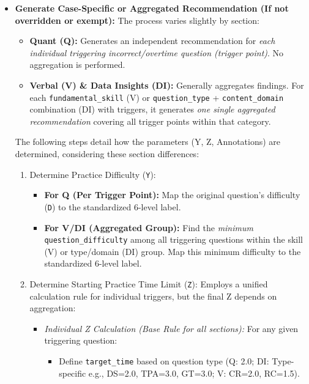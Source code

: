 \documentclass{article}
\begin{document}
\begin{enumerate}
\begin{itemize}
        \item \textbf{Generate Case-Specific or Aggregated Recommendation (If not overridden or exempt):} The process varies slightly by section:
            \begin{itemize}
                \item \textbf{Quant (Q):} Generates an independent recommendation for \textit{each individual triggering incorrect/overtime question (trigger point)}. No aggregation is performed.
                \item \textbf{Verbal (V) \& Data Insights (DI):} Generally aggregates findings. For each \texttt{fundamental\_skill} (V) or \texttt{question\_type} + \texttt{content\_domain} combination (DI) with triggers, it generates \textit{one single aggregated recommendation} covering all trigger points within that category.
            \end{itemize}
            The following steps detail how the parameters (Y, Z, Annotations) are determined, considering these section differences:
            \begin{enumerate}
                \item Determine Practice Difficulty (\texttt{Y}):
                    \begin{itemize}
                        \item \textbf{For Q (Per Trigger Point):} Map the original question's difficulty (\texttt{D}) to the standardized 6-level label.
                        \item \textbf{For V/DI (Aggregated Group):} Find the \textit{minimum} \texttt{question\_difficulty} among all triggering questions within the skill (V) or type/domain (DI) group. Map this minimum difficulty to the standardized 6-level label.
                    \end{itemize}
                \item Determine Starting Practice Time Limit (\texttt{Z}): Employs a unified calculation rule for individual triggers, but the final Z depends on aggregation:
                    \begin{itemize}
                        \item \textit{Individual Z Calculation (Base Rule for all sections):} For any given triggering question:
                            \begin{itemize}
                                \item Define \texttt{target\_time} based on question type (Q: 2.0; DI: Type-specific e.g., DS=2.0, TPA=3.0, GT=3.0; V: CR=2.0, RC=1.5).

\end{itemize}
\end{itemize}
\end{enumerate}
\end{itemize}
\end{enumerate}
\end{document}
